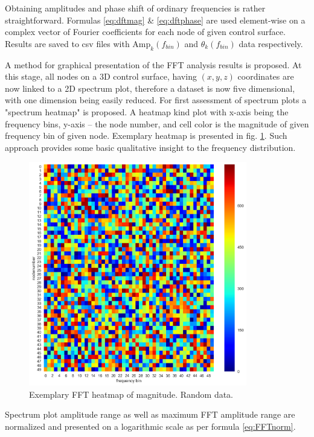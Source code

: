 Obtaining amplitudes and phase shift of ordinary frequencies is rather straightforward. Formulas \ref{eq:dftmag} \& \ref{eq:dftphase} are used element-wise on a complex vector of Fourier coefficients for each node of given control surface. Results are saved to csv files with $\text{Amp}_k(f_{bin})$ and $\theta_k(f_{bin})$ data respectively.

A method for graphical presentation of the FFT analysis results is proposed. At this stage, all nodes on a 3D control surface, having $(x, y, z)$ coordinates are now linked to a 2D spectrum plot, therefore a dataset is now five dimensional, with one dimension being easily reduced. For first assessment of spectrum plots a "spectrum heatmap" is proposed. A heatmap kind plot with x-axis being the frequency bins, y-axis -- the node number, and cell color is the magnitude of given frequency bin of given node. Exemplary heatmap is presented in fig. \ref{fft_heat}. Such approach provides some basic qualitative insight to the frequency distribution.

\begin{figure}[h!]
\centering %
\includegraphics[width=0.85\textwidth]{Pictures/fft_heat.png}
\caption{Exemplary FFT heatmap of magnitude. Random data.}
\label{fft_heat}
\end{figure}

Spectrum plot amplitude range as well as maximum FFT amplitude range are normalized and presented on a logarithmic scale as per formula \ref{eq:FFTnorm}. 

